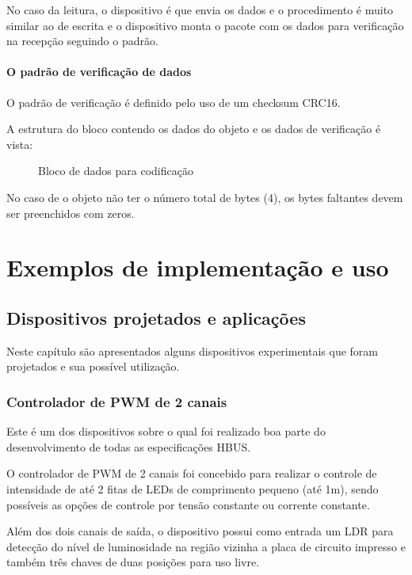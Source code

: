 \documentclass[11pt]{report}
\begin{document}
No caso da leitura, o dispositivo é que envia os dados e o procedimento é muito similar ao de escrita e o dispositivo monta o pacote com os dados para verificação na recepção seguindo o padrão.

\subsection{O padrão de verificação de dados}

O padrão de verificação é definido pelo uso de um checksum CRC16.

A estrutura do bloco contendo os dados do objeto e os dados de verificação é vista:

\begin{figure}[H]
\centering

\caption{Bloco de dados para codificação}
\end{figure}

No caso de o objeto não ter o número total de bytes (4), os bytes faltantes devem ser preenchidos com zeros.

\part{Exemplos de implementação e uso}

\chapter{Dispositivos projetados e aplicações}

Neste capítulo são apresentados alguns dispositivos experimentais que foram projetados e sua possível utilização.

\section{Controlador de PWM de 2 canais}

Este é um dos dispositivos sobre o qual foi realizado boa parte do desenvolvimento de todas as especificações HBUS.

O controlador de PWM de 2 canais foi concebido para realizar o controle de intensidade de até 2 fitas de LEDs de comprimento pequeno (até 1m), sendo possíveis as opções de controle por tensão constante ou corrente constante.

Além dos dois canais de saída, o dispositivo possui como entrada um LDR para detecção do nível de luminosidade na região vizinha a placa de circuito impresso e também três chaves de duas posições para uso livre.
\end{document}
